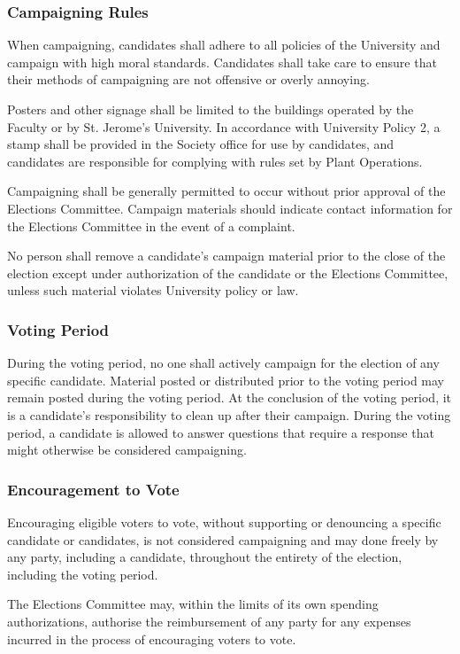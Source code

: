 \subsubsection{Campaigning Rules}
When campaigning, candidates shall adhere to all policies of the University and campaign with high moral standards.
Candidates shall take care to ensure that their methods of campaigning are not offensive or overly annoying.

Posters and other signage shall be limited to the buildings operated by the Faculty or by St. Jerome's University.
In accordance with University Policy 2, a stamp shall be provided in the Society office for use by candidates, and candidates are responsible for complying with rules set by Plant Operations.

Campaigning shall be generally permitted to occur without prior approval of the Elections Committee.
Campaign materials should indicate contact information for the Elections Committee in the event of a complaint.

No person shall remove a candidate's campaign material prior to the close of the election except under authorization of the candidate or the Elections Committee, unless such material violates University policy or law.

\subsubsection{Voting Period}
During the voting period, no one shall actively campaign for the election of any specific candidate.
Material posted or distributed prior to the voting period may remain posted during the voting period.
At the conclusion of the voting period, it is a candidate's responsibility to clean up after their campaign.
During the voting period, a candidate is allowed to answer questions that require a response that might otherwise be considered campaigning.

\subsubsection{Encouragement to Vote}
Encouraging eligible voters to vote, without supporting or denouncing a specific candidate or candidates, is not considered campaigning and may done freely by any party, including a candidate, throughout the entirety of the election, including the voting period.

The Elections Committee may, within the limits of its own spending authorizations, authorise the reimbursement of any party for any expenses incurred in the process of encouraging voters to vote.

